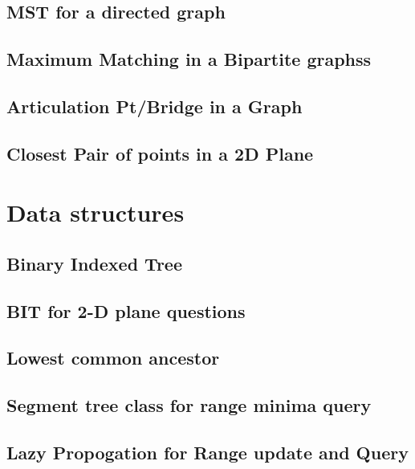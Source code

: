 \subsection{MST for a directed graph}
\raggedbottom
\hrulefill
\subsection{Maximum Matching in a Bipartite graphss}
\raggedbottom
\hrulefill
\subsection{Articulation Pt/Bridge in a Graph}
\raggedbottom
\hrulefill
\subsection{Closest Pair of points in a 2D Plane}
\raggedbottom
\hrulefill

\section{Data structures}
\subsection{Binary Indexed Tree}
\raggedbottom
\hrulefill
\subsection{BIT for 2-D plane questions}
\raggedbottom
\hrulefill
\subsection{Lowest common ancestor}
\raggedbottom
\hrulefill
\subsection{Segment tree class for range minima query}
\raggedbottom
\hrulefill
\subsection{Lazy Propogation for Range update and Query}
\raggedbottom
\hrulefill
